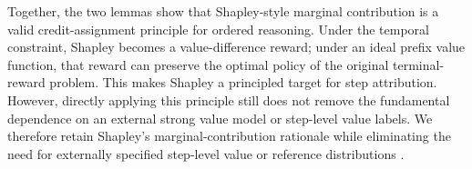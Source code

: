 Together, the two lemmas show that Shapley-style marginal contribution is a
valid credit-assignment principle for ordered reasoning.
Under the temporal constraint, Shapley becomes a value-difference reward; under
an ideal prefix value function, that reward can preserve the optimal policy of
the original terminal-reward problem.
This makes Shapley a principled target for step attribution.
However, directly applying this principle still does not remove the fundamental
dependence on an external strong value model or step-level value labels.
We therefore retain Shapley's marginal-contribution rationale while eliminating
the need for externally specified step-level value or reference distributions
\citep{ng1999policy,pmlr-v119-sundararajan20b,ovm:conf/naacl/YuGW24}.
